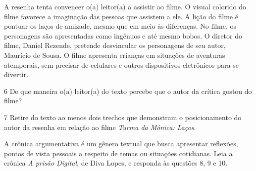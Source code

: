 \begin{boxlist}
 A resenha tenta convencer o(a) leitor(a) a assistir ao filme.
 O visual colorido do filme favorece a imaginação das pessoas que
assistem a ele.
 A lição do filme é pontuar os laços de amizade, mesmo que em meio às
diferenças.
 No filme, os personagens são apresentadas como ingênuos e até mesmo
bobos.
 O diretor do filme, Daniel Rezende, pretende desvincular os
personagens de seu autor, Maurício de Sousa.
 O filme apresenta crianças em situações de aventuras atemporais, sem
precisar de celulares e outros dispositivos eletrônicos para se
divertir.
\end{boxlist}


\num{6} De que maneira o(a) leitor(a) do texto percebe que o autor da
crítica gostou do filme?


\num{7} Retire do texto ao menos dois trechos que demonstram o
posicionamento do autor da resenha em relação ao filme \emph{Turma da
Mônica: Laços}.




A crônica argumentativa é um gênero textual que busca
apresentar reflexões, pontos de vista pessoais a respeito de temas ou
situações cotidianas. Leia a crônica \emph{A prisão Digital}, de Diva
Lopes, e responda às questões 8, 9 e 10.


